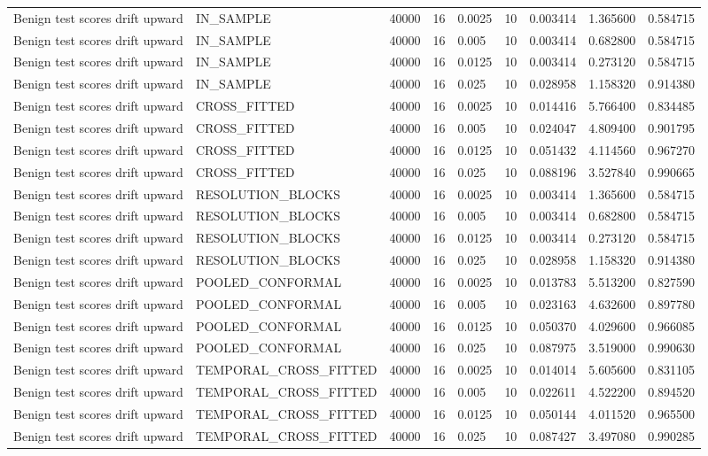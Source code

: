 \begin{tabular}{lllllllll}
Benign test scores drift upward & IN\_SAMPLE & 40000 & 16 & 0.0025 & 10 & 0.003414 & 1.365600 & 0.584715 \\
Benign test scores drift upward & IN\_SAMPLE & 40000 & 16 & 0.005 & 10 & 0.003414 & 0.682800 & 0.584715 \\
Benign test scores drift upward & IN\_SAMPLE & 40000 & 16 & 0.0125 & 10 & 0.003414 & 0.273120 & 0.584715 \\
Benign test scores drift upward & IN\_SAMPLE & 40000 & 16 & 0.025 & 10 & 0.028958 & 1.158320 & 0.914380 \\
Benign test scores drift upward & CROSS\_FITTED & 40000 & 16 & 0.0025 & 10 & 0.014416 & 5.766400 & 0.834485 \\
Benign test scores drift upward & CROSS\_FITTED & 40000 & 16 & 0.005 & 10 & 0.024047 & 4.809400 & 0.901795 \\
Benign test scores drift upward & CROSS\_FITTED & 40000 & 16 & 0.0125 & 10 & 0.051432 & 4.114560 & 0.967270 \\
Benign test scores drift upward & CROSS\_FITTED & 40000 & 16 & 0.025 & 10 & 0.088196 & 3.527840 & 0.990665 \\
Benign test scores drift upward & RESOLUTION\_BLOCKS & 40000 & 16 & 0.0025 & 10 & 0.003414 & 1.365600 & 0.584715 \\
Benign test scores drift upward & RESOLUTION\_BLOCKS & 40000 & 16 & 0.005 & 10 & 0.003414 & 0.682800 & 0.584715 \\
Benign test scores drift upward & RESOLUTION\_BLOCKS & 40000 & 16 & 0.0125 & 10 & 0.003414 & 0.273120 & 0.584715 \\
Benign test scores drift upward & RESOLUTION\_BLOCKS & 40000 & 16 & 0.025 & 10 & 0.028958 & 1.158320 & 0.914380 \\
Benign test scores drift upward & POOLED\_CONFORMAL & 40000 & 16 & 0.0025 & 10 & 0.013783 & 5.513200 & 0.827590 \\
Benign test scores drift upward & POOLED\_CONFORMAL & 40000 & 16 & 0.005 & 10 & 0.023163 & 4.632600 & 0.897780 \\
Benign test scores drift upward & POOLED\_CONFORMAL & 40000 & 16 & 0.0125 & 10 & 0.050370 & 4.029600 & 0.966085 \\
Benign test scores drift upward & POOLED\_CONFORMAL & 40000 & 16 & 0.025 & 10 & 0.087975 & 3.519000 & 0.990630 \\
Benign test scores drift upward & TEMPORAL\_CROSS\_FITTED & 40000 & 16 & 0.0025 & 10 & 0.014014 & 5.605600 & 0.831105 \\
Benign test scores drift upward & TEMPORAL\_CROSS\_FITTED & 40000 & 16 & 0.005 & 10 & 0.022611 & 4.522200 & 0.894520 \\
Benign test scores drift upward & TEMPORAL\_CROSS\_FITTED & 40000 & 16 & 0.0125 & 10 & 0.050144 & 4.011520 & 0.965500 \\
Benign test scores drift upward & TEMPORAL\_CROSS\_FITTED & 40000 & 16 & 0.025 & 10 & 0.087427 & 3.497080 & 0.990285 \\
\bottomrule
\end{tabular}
